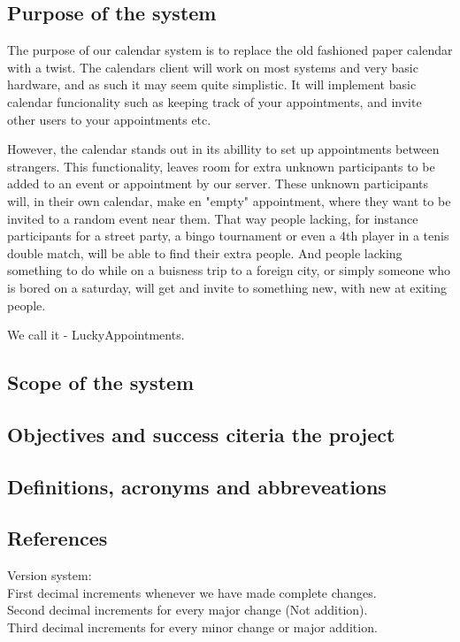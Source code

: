 \subsection{Purpose of the system}
		The purpose of our calendar system is to replace the old fashioned paper calendar with a twist. The calendars client will work on most systems and very basic hardware, and as such it may seem quite simplistic. It will implement basic calendar funcionality such as keeping track of your appointments, and invite other users to your appointments etc. 

		However, the calendar stands out in its abillity to set up appointments between strangers. This functionality, leaves room for extra unknown participants to be added to an event or appointment by our server. These unknown participants will, in their own calendar, make en "empty" appointment, where they want to be invited to a random event near them. That way people lacking, for instance participants for a street party, a bingo tournament or even a 4th player in a tenis double match, will be able to find their extra people. And people lacking something to do while on a buisness trip to a foreign city, or simply someone who is bored on a saturday, will get and invite to something new, with new at exiting people.

		We call it - LuckyAppointments.

\subsection{Scope of the system}

\subsection{Objectives and success citeria the project}

\subsection{Definitions, acronyms and abbreveations}

\subsection{References}


Version system:\\
First decimal increments whenever we have made complete changes. \\
Second decimal increments for every major change (Not addition).   \\
Third decimal increments for every minor change or major addition.\\

